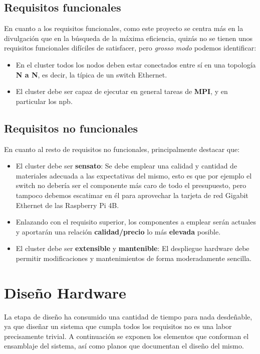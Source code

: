 \subsection{Requisitos funcionales}
En cuanto a los requisitos funcionales, como este proyecto se centra más en la divulgación que en la búsqueda de la máxima eficiencia, quizás no se tienen unos requisitos funcionales difíciles de satisfacer, pero \textit{grosso modo} podemos identificar:

\begin{itemize}
    \item En el cluster todos los nodos deben estar conectados entre sí en una topología \textbf{N a N}, es decir, la típica de un switch Ethernet.
    \item El cluster debe ser capaz de ejecutar en general tareas de \textbf{MPI}, y en particular los \acrlong{npb}.
\end{itemize}

\subsection{Requisitos no funcionales}
En cuanto al resto de requisitos no funcionales, principalmente destacar que:
\begin{itemize}
    \item El cluster debe ser \textbf{sensato}: Se debe emplear una calidad y cantidad de materiales adecuada a las expectativas del mismo, esto es que por ejemplo el switch no debería ser el componente más caro de todo el presupuesto, pero tampoco debemos escatimar en él para aprovechar la tarjeta de red Gigabit Ethernet de las Raspberry Pi 4B.
    \item Enlazando con el requisito superior, los componentes a emplear serán actuales y aportarán una relación \textbf{calidad/precio} lo más \textbf{elevada} posible.
    \item El cluster debe ser \textbf{extensible} y \textbf{mantenible}: El despliegue hardware debe permitir modificaciones y mantenimientos de forma moderadamente sencilla.
\end{itemize}

\section{Diseño Hardware}
\label{sec:diseño_hardware}
La etapa de diseño ha consumido una cantidad de tiempo para nada desdeñable, ya que diseñar un sistema que cumpla todos los requisitos no es una labor precisamente trivial. A continuación se exponen los elementos que conforman el ensamblaje del sistema, así como planos que documentan el diseño del mismo.

